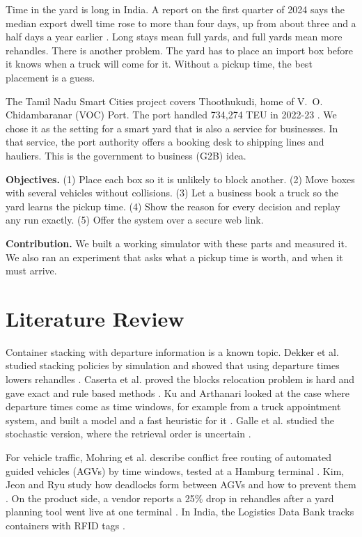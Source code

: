 \documentclass[conference]{IEEEtran}
\begin{document}
Time in the yard is long in India. A report on the first quarter of 2024 says the median export dwell time rose to more than four days, up from about three and a half days a year earlier \cite{bw2024}. Long stays mean full yards, and full yards mean more rehandles. There is another problem. The yard has to place an import box before it knows when a truck will come for it. Without a pickup time, the best placement is a guess.

The Tamil Nadu Smart Cities project covers Thoothukudi, home of V.~O. Chidambaranar (VOC) Port. The port handled 734,274 TEU in 2022-23 \cite{wikivoc}. We chose it as the setting for a smart yard that is also a service for businesses. In that service, the port authority offers a booking desk to shipping lines and hauliers. This is the government to business (G2B) idea.

\textbf{Objectives.} (1) Place each box so it is unlikely to block another. (2) Move boxes with several vehicles without collisions. (3) Let a business book a truck so the yard learns the pickup time. (4) Show the reason for every decision and replay any run exactly. (5) Offer the system over a secure web link.

\textbf{Contribution.} We built a working simulator with these parts and measured it. We also ran an experiment that asks what a pickup time is worth, and when it must arrive.

\section{Literature Review}
Container stacking with departure information is a known topic. Dekker et al. studied stacking policies by simulation and showed that using departure times lowers rehandles \cite{dekker2006}. Caserta et al. proved the blocks relocation problem is hard and gave exact and rule based methods \cite{caserta2012}. Ku and Arthanari looked at the case where departure times come as time windows, for example from a truck appointment system, and built a model and a fast heuristic for it \cite{ku2016}. Galle et al. studied the stochastic version, where the retrieval order is uncertain \cite{galle2017}.

For vehicle traffic, Mohring et al. describe conflict free routing of automated guided vehicles (AGVs) by time windows, tested at a Hamburg terminal \cite{mohring2005}. Kim, Jeon and Ryu study how deadlocks form between AGVs and how to prevent them \cite{kim2007}. On the product side, a vendor reports a 25\% drop in rehandles after a yard planning tool went live at one terminal \cite{kaleris2023}. In India, the Logistics Data Bank tracks containers with RFID tags \cite{ldb}.
\end{document}
